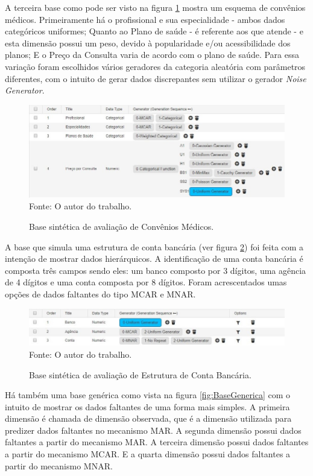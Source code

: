 \documentclass[
	12pt,				%
	openright,			%
	oneside,			%
	a4paper,			%
	english,			%
	brazil				%
	]{abntex2}
\begin{document}
		
		A terceira base como pode ser visto na figura \ref{fig:CMModelo} mostra um esquema de convênios médicos.
		Primeiramente há o profissional e sua especialidade - ambos dados categóricos uniformes;
		Quanto ao Plano de saúde - é referente aos que atende - e esta dimensão possui um peso, devido à popularidade e/ou acessibilidade dos planos;
		E o Preço da Consulta varia de acordo com o plano de saúde.
		Para essa variação foram escolhidos vários geradores da categoria aleatória com parâmetros diferentes, com o intuito de gerar dados discrepantes sem utilizar o gerador \emph{Noise Generator}.
		\par
		\begin{figure}[h!]
			\centering
			\caption{Base sintética de avaliação de Convênios Médicos.}
			\includegraphics[width=\linewidth]{./figures/Resultados/CMModelo.jpg}
			\label{fig:CMModelo}
			\footnotesize Fonte: O autor do trabalho.
		\end{figure}

		A base que simula uma estrutura de conta bancária (ver figura \ref{fig:BancoModelo}) foi feita com a intenção de mostrar dados hierárquicos.
		A identificação de uma conta bancária é composta três campos sendo eles: 
		 um banco composto por 3 dígitos,
		 uma agência de 4 dígitos e 
		 uma conta composta por 8 dígitos.
		Foram acrescentados umas opções de dados faltantes do tipo MCAR e MNAR.

		\begin{figure}[h!]
			\centering
			\caption{Base sintética de avaliação de Estrutura de Conta Bancária.}
			\includegraphics[width=\linewidth]{./figures/Resultados/BancoModelo.jpg}
			\label{fig:BancoModelo}
			\footnotesize Fonte: O autor do trabalho.
		\end{figure}

		Há também uma base genérica como vista na figura \ref{fig:BaseGenerica} com o intuito de mostrar os dados faltantes de uma forma mais simples.
		A primeira dimensão é chamada de dimensão observada, que é a dimensão utilizada para predizer dados faltantes no mecanismo MAR.
		A segunda dimensão possui dados faltantes a partir do mecanismo MAR.
		A terceira dimensão possui dados faltantes a partir do mecanismo MCAR. 
		E a quarta dimensão possui dados faltantes a partir do mecanismo MNAR.
\end{document}
